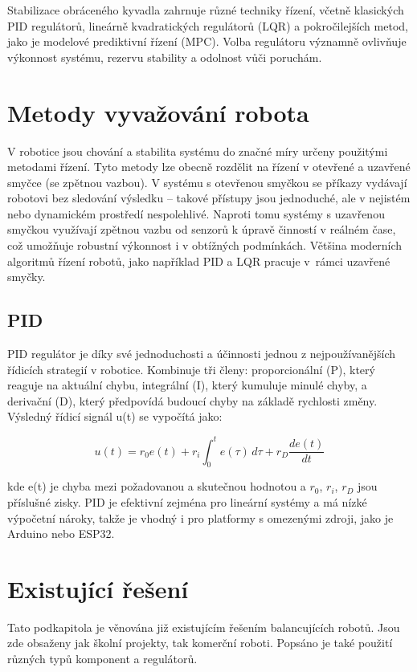 Stabilizace obráceného kyvadla zahrnuje různé techniky řízení, včetně klasických PID regulátorů, lineárně kvadratických regulátorů (LQR) a pokročilejších metod, jako je modelové prediktivní řízení (MPC). Volba regulátoru významně ovlivňuje výkonnost systému, rezervu stability a odolnost vůči poruchám. \cite{kyvadlo}

\section{Metody vyvažování robota}
V robotice jsou chování a stabilita systému do značné míry určeny použitými metodami řízení. Tyto metody lze obecně rozdělit na řízení v otevřené a uzavřené smyčce (se zpětnou vazbou). V systému s otevřenou smyčkou se příkazy vydávají robotovi bez sledování výsledku -- takové přístupy jsou jednoduché, ale v nejistém nebo dynamickém prostředí nespolehlivé. Naproti tomu systémy s uzavřenou smyčkou využívají zpětnou vazbu od senzorů k úpravě činností v reálném čase, což umožňuje robustní výkonnost i v obtížných podmínkách. Většina moderních algoritmů řízení robotů, jako například PID a LQR pracuje v~rámci uzavřené smyčky.

\subsection*{PID}
PID regulátor je díky své jednoduchosti a účinnosti jednou z nejpoužívanějších řídicích strategií v robotice. Kombinuje tři členy: proporcionální (P), který reaguje na aktuální chybu, integrální (I), který kumuluje minulé chyby, a derivační (D), který předpovídá budoucí chyby na základě rychlosti změny. Výsledný řídicí signál u(t) se vypočítá jako:

\[
u(t) = r_0 e(t) + r_i \int_0^t e(\tau) \, d\tau + r_D \frac{de(t)}{dt}
\]

kde e(t) je chyba mezi požadovanou a skutečnou hodnotou a $r_0$, $r_i$, $r_D$ jsou příslušné zisky. PID je efektivní zejména pro lineární systémy a má nízké výpočetní nároky, takže je vhodný i pro platformy s omezenými zdroji, jako je Arduino nebo ESP32. \cite{PID}

\section{Existující řešení}
Tato podkapitola je věnována již existujícím řešením balancujících robotů. Jsou zde obsaženy jak školní projekty, tak komerční roboti. Popsáno je také použití různých typů komponent a regulátorů.


